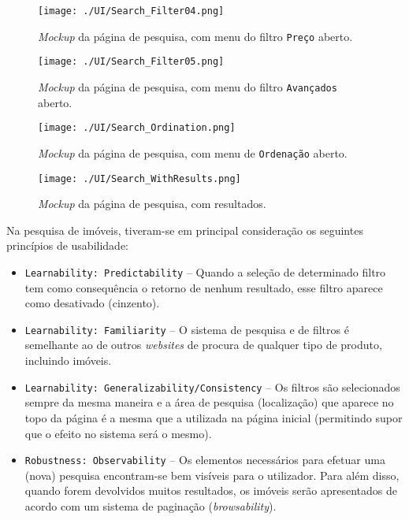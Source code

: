 \begin{figure}[H]
    \centering
    \texttt{[image: ./UI/Search\_Filter04.png]}
    \caption{\textit{Mockup} da página de pesquisa, com menu do filtro \texttt{Preço} aberto.}
    \label{fig:search_filter04}
\end{figure}

\begin{figure}[H]
    \centering
    \texttt{[image: ./UI/Search\_Filter05.png]}
    \caption{\textit{Mockup} da página de pesquisa, com menu do filtro \texttt{Avançados} aberto.}
    \label{fig:search_filter05}
\end{figure}

\begin{figure}[H]
    \centering
    \texttt{[image: ./UI/Search\_Ordination.png]}
    \caption{\textit{Mockup} da página de pesquisa, com menu de \texttt{Ordenação} aberto.}
    \label{fig:search_ordination}
\end{figure}

\begin{figure}[H]
    \centering
    \texttt{[image: ./UI/Search\_WithResults.png]}
    \caption{\textit{Mockup} da página de pesquisa, com resultados.}
    \label{fig:search_with_results}
\end{figure}

Na pesquisa de imóveis, tiveram-se em principal consideração os seguintes princípios de usabilidade:

\begin{itemize}
    \item \texttt{Learnability: Predictability} -- Quando a seleção de determinado filtro tem como consequência o retorno de nenhum resultado, esse filtro aparece como desativado (cinzento).

    \item \texttt{Learnability: Familiarity} -- O sistema de pesquisa e de filtros é semelhante ao de outros \textit{websites} de procura de qualquer tipo de produto, incluindo imóveis.
    
    \item \texttt{Learnability:  Generalizability/Consistency} -- Os filtros são selecionados sempre da mesma maneira e a área de pesquisa (localização) que aparece no topo da página é a mesma que a utilizada na página inicial (permitindo supor que o efeito no sistema será o mesmo).
    
    \item \texttt{Robustness: Observability} -- Os elementos necessários para efetuar uma (nova) pesquisa encontram-se bem visíveis para o utilizador. Para além disso, quando forem devolvidos muitos resultados, os imóveis serão apresentados de acordo com um sistema de paginação (\textit{browsability}).
\end{itemize}

